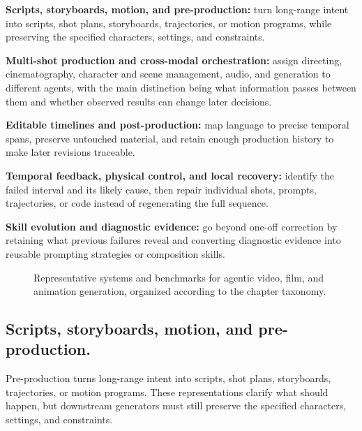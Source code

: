 \begin{keytakeaway}
\begin{keypoints}
  \item \textbf{Scripts, storyboards, motion, and pre-production:} turn long-range intent into scripts, shot plans, storyboards, trajectories, or motion programs, while preserving the specified characters, settings, and constraints.

  \item \textbf{Multi-shot production and cross-modal orchestration:} assign directing, cinematography, character and scene management, audio, and generation to different agents, with the main distinction being what information passes between them and whether observed results can change later decisions.

  \item \textbf{Editable timelines and post-production:} map language to precise temporal spans, preserve untouched material, and retain enough production history to make later revisions traceable.

  \item \textbf{Temporal feedback, physical control, and local recovery:} identify the failed interval and its likely cause, then repair individual shots, prompts, trajectories, or code instead of regenerating the full sequence.

  \item \textbf{Skill evolution and diagnostic evidence:} go beyond one-off correction by retaining what previous failures reveal and converting diagnostic evidence into reusable prompting strategies or composition skills.
\end{keypoints}
\end{keytakeaway}

\begin{figure}[!htbp]
  \centering
  
  \caption{Representative systems and benchmarks for agentic video, film, and animation generation, organized according to the chapter taxonomy.}
  \label{fig:ch5-representative-systems}
\end{figure}

\subsection{Scripts, storyboards, motion, and pre-production.}
Pre-production turns long-range intent into scripts, shot plans, storyboards, trajectories, or motion programs. These representations clarify what should happen, but downstream generators must still preserve the specified characters, settings, and constraints.

